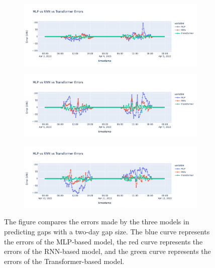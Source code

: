 \begin{figure}[H]
	\centering
	\begin{subfigure}{\textwidth}
		\centering
		\includegraphics[width=\textwidth]{chapters/4_evaluation/imgs/cmp1.png}
		\caption{}
	\end{subfigure}
	\begin{subfigure}{\textwidth}
		\centering
		\includegraphics[width=\textwidth]{chapters/4_evaluation/imgs/cmp3.png}
		\caption{}
	\end{subfigure}
	\begin{subfigure}{\textwidth}
		\centering
		\includegraphics[width=\textwidth]{chapters/4_evaluation/imgs/cmp4.png}
		\caption{}
	\end{subfigure}
	\caption{The figure compares the errors made by the three models in predicting gaps with a two-day gap size. The blue curve represents the errors of the MLP-based model, the red curve represents the errors of the RNN-based model, and the green curve represents the errors of the Transformer-based model.}

\end{figure}
